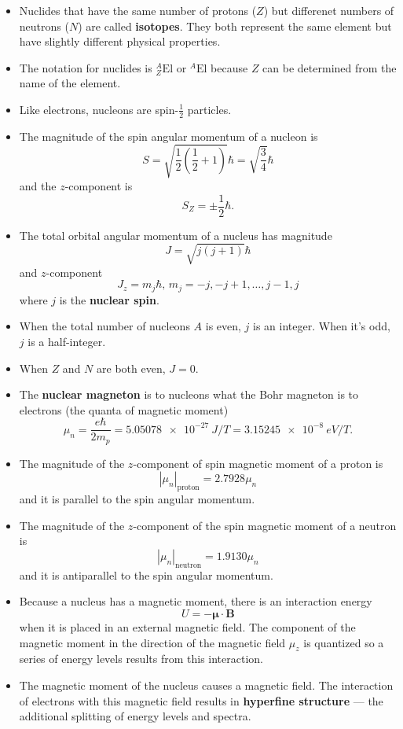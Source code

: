 \documentclass{article}
\begin{document}
\begin{itemize}
  \item Nuclides that have the same number of protons ($Z$) but differenet numbers of neutrons ($N$) are called \textbf{isotopes}. They both represent the same element but have slightly different physical properties.

  \item The notation for nuclides is $^A_Z \text{El}$ or $^A \text{El}$ because $Z$ can be determined from the name of the element.

  \item Like electrons, nucleons are spin-$\frac{1}{2}$ particles.

  \item The magnitude of the spin angular momentum of a nucleon is \[S = \sqrt{\frac{1}{2} \left( \frac{1}{2} + 1 \right)} \hbar = \sqrt{\frac{3}{4}} \hbar\] and the $z$-component is \[S_Z = \pm \frac{1}{2} \hbar.\]

  \item The total orbital angular momentum of a nucleus has magnitude \[J = \sqrt{j (j + 1)} \hbar\] and $z$-component \[J_z = m_j \hbar, \,m_j = -j, -j + 1, \ldots, j - 1, j\] where $j$ is the \textbf{nuclear spin}.

  \item When the total number of nucleons $A$ is even, $j$ is an integer. When it's odd, $j$ is a half-integer.

  \item When $Z$ and $N$ are both even, $J = 0$.

  \item The \textbf{nuclear magneton} is to nucleons what the Bohr magneton is to electrons (the quanta of magnetic moment) \[\mu_n = \frac{e \hbar}{2 m_p} = \qty{5.05078e-27}{J/T} = \qty{3.15245e-8}{eV/T}.\]

  \item The magnitude of the $z$-component of spin magnetic moment of a proton is \[|\mu_n|_\text{proton} = 2.7928 \mu_n\] and it is parallel to the spin angular momentum.

  \item The magnitude of the $z$-component of the spin magnetic moment of a neutron is \[|\mu_n|_\text{neutron} = 1.9130 \mu_n\] and it is antiparallel to the spin angular momentum.

  \item Because a nucleus has a magnetic moment, there is an interaction energy \[U = -\boldsymbol{\mu} \cdot \mathbf{B}\] when it is placed in an external magnetic field. The component of the magnetic moment in the direction of the magnetic field $\mu_z$ is quantized so a series of energy levels results from this interaction.

  \item The magnetic moment of the nucleus causes a magnetic field. The interaction of electrons with this magnetic field results in \textbf{hyperfine structure} — the additional splitting of energy levels and spectra.
\end{itemize}
\end{document}
